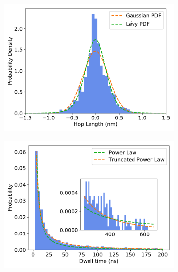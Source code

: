\documentclass{article}
\begin{document}
\begin{figure}[htb!]
\begin{subfigure}{0.3\textwidth}
  \includegraphics[width=\textwidth]{gaussian_levy_comparison_anomalous_ACH.pdf}
  \caption{}\label{fig:ACH_hop_distribution_comparison}
  \end{subfigure}
  \begin{subfigure}{0.3\textwidth}
  \includegraphics[width=\textwidth]{ACH_powerlaw.pdf}
  \caption{}\label{fig:ACH_powerlaw}
  \end{subfigure}
  \begin{subfigure}{0.3\textwidth}

\end{subfigure}
\end{figure}
\end{document}
